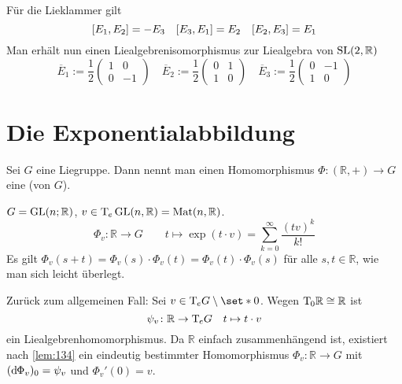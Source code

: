 \begin{beispiel*}[{name=[Überlagerung der speziellen linearen Gruppe]}]
\[	\]
	Für die Lieklammer gilt
	\[
		\benbrace*{E_1,E_2} = - E_3 \quad \benbrace*{E_3,E_1} = E_2 \quad \benbrace*{E_2,E_3} =E_1
	\]
	Man erhält nun einen Liealgebrenisomorphismus zur Liealgebra von $\operatorname{SL}(2,\mathbb{R})$ 
	\[
		\overline{E}_1 := \frac{1}{2} \begin{pmatrix}
			1 & 0 \\ 0 & -1
		\end{pmatrix} \quad 
		\overline{E}_2 := \frac{1}{2}  \begin{pmatrix}
			0 & 1 \\ 1 & 0
		\end{pmatrix} \quad 
		\overline{E}_3 := \frac{1}{2} \begin{pmatrix}
			0 & -1 \\ 1 & 0
		\end{pmatrix} 
	\]
\end{beispiel*}

\section{Die Exponentialabbildung} %
\label{sec:14}

\begin{definition}[{name=[{Einparameteruntergruppe}]}]
	Sei $G$ eine Liegruppe.
	Dann nennt man einen Homomorphismus $\Phi \colon (\mathbb{R},+) \to G$ eine  (von $G$).
\end{definition}

\begin{beispiel*}[{name=[Einparametergruppe der allgemeinen linearen Gruppe]}]
	$G = \operatorname{GL}(n;\mathbb{R})$, $v \in \mathrm{T}\mkern-0.85mu_e \operatorname{GL}(n,\mathbb{R}) = \operatorname{Mat}(n,\mathbb{R})$.
	\[
		\Phi_v \colon \mathbb{R} \longrightarrow G \qquad t \longmapsto \exp(t \cdot v) = \sum_{k=0}^{\infty}  \frac{(tv)^k}{k!} 
	\]
	Es gilt $\Phi_v(s+t) = \Phi_v(s) \cdot \Phi_v(t) = \Phi_v(t) \cdot \Phi_v(s)$ für alle $s,t \in \mathbb{R}$, wie man sich leicht überlegt.
\end{beispiel*}

Zurück zum allgemeinen Fall: Sei $v \in \Tmap_e G \setminus \set*{0}$.
Wegen $\mathrm{T}\mkern-0.85mu_0 \mathbb{R} \cong \mathbb{R}$ ist
\[
	\psi_v \colon \mathbb{R} \to \mathrm{T}\mkern-0.85mu_e G \quad t \mapsto t \cdot v
\]
ein Liealgebrenhomomorphismus. 
Da $\mathbb{R}$ einfach zusammenhängend ist, existiert nach \autoref{lem:134} ein eindeutig bestimmter Homomorphismus
\(
	\Phi_v \colon \mathbb{R} \to G
\)
mit $(\mathrm{d}\mkern-1.0mu \Phi_v)_0 = \psi_v$ und $\Phi_v'(0)= v$.

